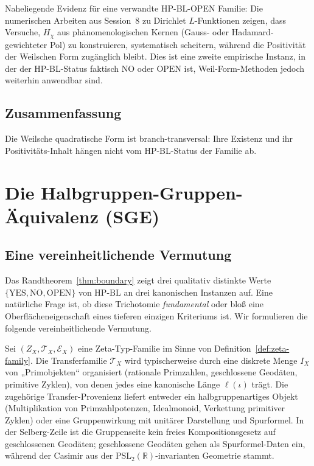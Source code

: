 \documentclass[11pt]{article}
\theoremstyle{definition}
\theoremstyle{remark}
\newcommand{\HBL}{\mathrm{HP\text{-}BL}}
\newcommand{\PSL}{\mathrm{PSL}}
\begin{document}
Naheliegende Evidenz für eine verwandte HP-BL-OPEN Familie: Die numerischen
Arbeiten aus Session~8 zu Dirichlet $L$-Funktionen
\cite{PaleyWienerDirichlet} zeigen, dass Versuche, $H_\chi$ aus phänomenologischen Kernen
(Gauss- oder Hadamard-gewichteter Pol) zu konstruieren,
systematisch scheitern, während die Positivität der Weilschen Form
zugänglich bleibt. Dies ist eine zweite empirische Instanz, in der
der HP-BL-Status faktisch $\mathrm{NO}$ oder $\mathrm{OPEN}$ ist, Weil-Form-Methoden
jedoch weiterhin anwendbar sind.

\subsection{Zusammenfassung}

Die Weilsche quadratische Form ist branch-transversal: Ihre Existenz und ihr
Positivitäts-Inhalt hängen nicht vom HP-BL-Status der Familie ab.

\section{Die Halbgruppen-Gruppen-Äquivalenz (SGE)}
\label{sec:sge-conjecture}

\subsection{Eine vereinheitlichende Vermutung}
\label{sec:sge-conjecture-statement}

Das Randtheorem~\ref{thm:boundary} zeigt drei qualitativ distinkte Werte
$\{\mathrm{YES}, \mathrm{NO}, \mathrm{OPEN}\}$ von $\HBL$ an drei kanonischen Instanzen
auf. Eine natürliche Frage ist, ob diese Trichotomie \emph{fundamental}
oder bloß eine Oberflächeneigenschaft eines tieferen einzigen Kriteriums ist.
Wir formulieren die folgende vereinheitlichende Vermutung.

Sei $(Z_X, \mathcal{T}_X, \mathcal{E}_X)$ eine Zeta-Typ-Familie im Sinne von
Definition~\ref{def:zeta-family}. Die Transferfamilie $\mathcal{T}_X$ wird
typischerweise durch eine diskrete Menge $I_X$ von „Primobjekten“ organisiert
(rationale Primzahlen, geschlossene Geodäten, primitive Zyklen), von denen jedes
eine kanonische Länge $\ell(\iota)$ trägt. Die zugehörige Transfer-Provenienz
liefert entweder ein halbgruppenartiges Objekt (Multiplikation von
Primzahlpotenzen, Idealmonoid, Verkettung primitiver Zyklen) oder eine
Gruppenwirkung mit unitärer Darstellung und Spurformel. In der Selberg-Zeile
ist die Gruppenseite kein freies Kompositionsgesetz auf geschlossenen
Geodäten; geschlossene Geodäten gehen als Spurformel-Daten ein, während der
Casimir aus der $\PSL_2(\mathbb{R})$-invarianten Geometrie stammt.
\end{document}
